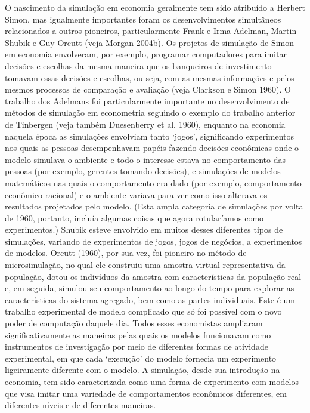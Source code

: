 \documentclass[12pt]{article}
\begin{document}
O nascimento da simulação em economia geralmente tem sido atribuído a Herbert Simon, mas igualmente importantes foram os desenvolvimentos simultâneos relacionados a outros pioneiros, particularmente Frank e Irma Adelman, Martin Shubik e Guy Orcutt (veja Morgan 2004b). Os projetos de simulação de Simon em economia envolveram, por exemplo, programar computadores para imitar decisões e escolhas da mesma maneira que os banqueiros de investimento tomavam essas decisões e escolhas, ou seja, com as mesmas informações e pelos mesmos processos de comparação e avaliação (veja Clarkson e Simon 1960). O trabalho dos Adelmans foi particularmente importante no desenvolvimento de métodos de simulação em econometria seguindo o exemplo do trabalho anterior de Tinbergen (veja também Duesenberry et al. 1960), enquanto na economia naquela época as simulações envolviam tanto ‘jogos’, significando experimentos nos quais as pessoas desempenhavam papéis fazendo decisões econômicas onde o modelo simulava o ambiente e todo o interesse estava no comportamento das pessoas (por exemplo, gerentes tomando decisões), e simulações de modelos matemáticos nas quais o comportamento era dado (por exemplo, comportamento econômico racional) e o ambiente variava para ver como isso alterava os resultados projetados pelo modelo. (Esta ampla categoria de simulações por volta de 1960, portanto, incluía algumas coisas que agora rotularíamos como experimentos.) Shubik esteve envolvido em muitos desses diferentes tipos de simulações, variando de experimentos de jogos, jogos de negócios, a experimentos de modelos. Orcutt (1960), por sua vez, foi pioneiro no método de microsimulação, no qual ele construiu uma amostra virtual representativa da população, dotou os indivíduos da amostra com características da população real e, em seguida, simulou seu comportamento ao longo do tempo para explorar as características do sistema agregado, bem como as partes individuais. Este é um trabalho experimental de modelo complicado que só foi possível com o novo poder de computação daquele dia. Todos esses economistas ampliaram significativamente as maneiras pelas quais os modelos funcionavam como instrumentos de investigação por meio de diferentes formas de atividade experimental, em que cada ‘execução’ do modelo fornecia um experimento ligeiramente diferente com o modelo. A simulação, desde sua introdução na economia, tem sido caracterizada como uma forma de experimento com modelos que visa imitar uma variedade de comportamentos econômicos diferentes, em diferentes níveis e de diferentes maneiras.
\end{document}
